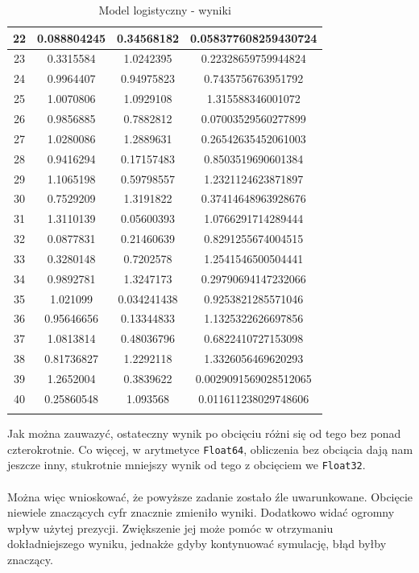 \documentclass[15pt, a4paper]{article}
\begin{document}
\begin{longtable}{|c|c|c|c|}
        22 & 0.088804245 & 0.34568182 & 0.058377608259430724 \\ \hline
        23 & 0.3315584 & 1.0242395 & 0.22328659759944824 \\ \hline
        24 & 0.9964407 & 0.94975823 & 0.7435756763951792 \\ \hline
        25 & 1.0070806 & 1.0929108 & 1.315588346001072 \\ \hline
        26 & 0.9856885 & 0.7882812 & 0.07003529560277899 \\ \hline
        27 & 1.0280086 & 1.2889631 & 0.26542635452061003 \\ \hline
        28 & 0.9416294 & 0.17157483 & 0.8503519690601384 \\ \hline
        29 & 1.1065198 & 0.59798557 & 1.2321124623871897 \\ \hline
        30 & 0.7529209 & 1.3191822 & 0.37414648963928676 \\ \hline
        31 & 1.3110139 & 0.05600393 & 1.0766291714289444 \\ \hline
        32 & 0.0877831 & 0.21460639 & 0.8291255674004515 \\ \hline
        33 & 0.3280148 & 0.7202578 & 1.2541546500504441 \\ \hline
        34 & 0.9892781 & 1.3247173 & 0.29790694147232066 \\ \hline
        35 & 1.021099 & 0.034241438 & 0.9253821285571046 \\ \hline
        36 & 0.95646656 & 0.13344833 & 1.1325322626697856 \\ \hline
        37 & 1.0813814 & 0.48036796 & 0.6822410727153098 \\ \hline
        38 & 0.81736827 & 1.2292118 & 1.3326056469620293 \\ \hline
        39 & 1.2652004 & 0.3839622 & 0.0029091569028512065 \\ \hline
        40 & 0.25860548 & 1.093568 & 0.011611238029748606 \\ \hline
    \caption{Model logistyczny - wyniki}
\end{longtable}

\vspace{0.5cm}

\noindent Jak można zauwazyć, ostateczny wynik po obcięciu różni się od tego bez ponad czterokrotnie. Co więcej, w arytmetyce \verb|Float64|, obliczenia bez obciącia dają nam jeszcze inny, stukrotnie mniejszy wynik od tego z obcięciem we \verb|Float32|.\\\\
\noindent Można więc wnioskować, że powyższe zadanie zostało źle uwarunkowane. Obcięcie niewiele znaczących cyfr znacznie zmieniło wyniki. Dodatkowo widać ogromny wpływ użytej prezycji. Zwiększenie jej może pomóc w otrzymaniu dokładniejszego wyniku, jednakże gdyby kontynuować symulację, błąd byłby znaczący.
\end{document}
